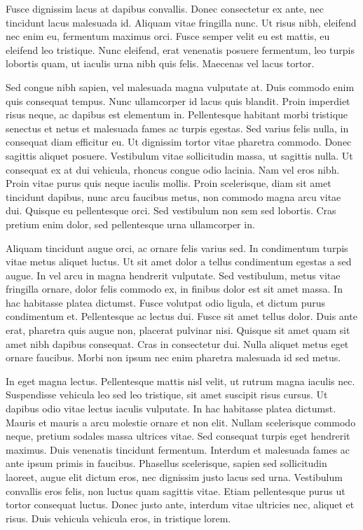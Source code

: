Fusce dignissim lacus at dapibus convallis. Donec consectetur ex ante, nec tincidunt lacus malesuada id. Aliquam vitae fringilla nunc. Ut risus nibh, eleifend nec enim eu, fermentum maximus orci. Fusce semper velit eu est mattis, eu eleifend leo tristique. Nunc eleifend, erat venenatis posuere fermentum, leo turpis lobortis quam, ut iaculis urna nibh quis felis. Maecenas vel lacus tortor.

Sed congue nibh sapien, vel malesuada magna vulputate at. Duis commodo enim quis consequat tempus. Nunc ullamcorper id lacus quis blandit. Proin imperdiet risus neque, ac dapibus est elementum in. Pellentesque habitant morbi tristique senectus et netus et malesuada fames ac turpis egestas. Sed varius felis nulla, in consequat diam efficitur eu. Ut dignissim tortor vitae pharetra commodo. Donec sagittis aliquet posuere. Vestibulum vitae sollicitudin massa, ut sagittis nulla. Ut consequat ex at dui vehicula, rhoncus congue odio lacinia. Nam vel eros nibh. Proin vitae purus quis neque iaculis mollis. Proin scelerisque, diam sit amet tincidunt dapibus, nunc arcu faucibus metus, non commodo magna arcu vitae dui. Quisque eu pellentesque orci. Sed vestibulum non sem sed lobortis. Cras pretium enim dolor, sed pellentesque urna ullamcorper in.

Aliquam tincidunt augue orci, ac ornare felis varius sed. In condimentum turpis vitae metus aliquet luctus. Ut sit amet dolor a tellus condimentum egestas a sed augue. In vel arcu in magna hendrerit vulputate. Sed vestibulum, metus vitae fringilla ornare, dolor felis commodo ex, in finibus dolor est sit amet massa. In hac habitasse platea dictumst. Fusce volutpat odio ligula, et dictum purus condimentum et. Pellentesque ac lectus dui. Fusce sit amet tellus dolor. Duis ante erat, pharetra quis augue non, placerat pulvinar nisi. Quisque sit amet quam sit amet nibh dapibus consequat. Cras in consectetur dui. Nulla aliquet metus eget ornare faucibus. Morbi non ipsum nec enim pharetra malesuada id sed metus.

In eget magna lectus. Pellentesque mattis nisl velit, ut rutrum magna iaculis nec. Suspendisse vehicula leo sed leo tristique, sit amet suscipit risus cursus. Ut dapibus odio vitae lectus iaculis vulputate. In hac habitasse platea dictumst. Mauris et mauris a arcu molestie ornare et non elit. Nullam scelerisque commodo neque, pretium sodales massa ultrices vitae. Sed consequat turpis eget hendrerit maximus. Duis venenatis tincidunt fermentum. Interdum et malesuada fames ac ante ipsum primis in faucibus. Phasellus scelerisque, sapien sed sollicitudin laoreet, augue elit dictum eros, nec dignissim justo lacus sed urna. Vestibulum convallis eros felis, non luctus quam sagittis vitae. Etiam pellentesque purus ut tortor consequat luctus. Donec justo ante, interdum vitae ultricies nec, aliquet et risus. Duis vehicula vehicula eros, in tristique lorem.


